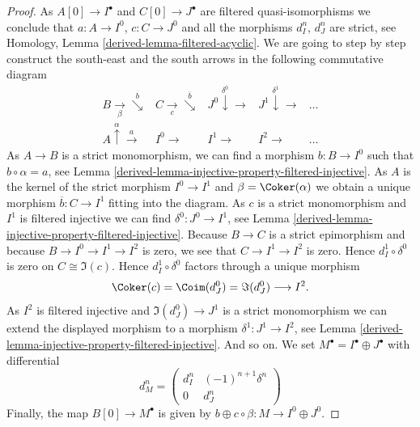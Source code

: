 \begin{proof}

As $A[0] \to I^\bullet$ and $C[0] \to J^\bullet$ are filtered
quasi-isomorphisms we conclude that $a : A \to I^0$, $c : C \to J^0$
and all the morphisms $d_I^n$, $d_J^n$ are strict, see
Homology, Lemma \ref{derived-lemma-filtered-acyclic}.
We are going to step by step construct the south-east and the south
arrows in the following commutative diagram
$$
\begin{array}{ccccc}B \underset{\beta}{\longrightarrow}\overset{b}{\searrow} & C \underset{c}{\longrightarrow}\overset{\overline{b}}{\searrow} & J^0 \overset{\delta^0}{\downarrow}\longrightarrow & J^1 \overset{\delta^1}{\downarrow}\longrightarrow & \ldots \\ A \overset{\alpha}{\uparrow}\overset{a}{\longrightarrow} & I^0 \longrightarrow & I^1 \longrightarrow & I^2 \longrightarrow & \ldots\end{array}
$$
As $A \to B$ is a strict monomorphism, we can find a morphism
$b : B \to I^0$ such that $b \circ \alpha = a$, see
Lemma \ref{derived-lemma-injective-property-filtered-injective}.
As $A$ is the kernel of the strict morphism $I^0 \to I^1$
and $\beta = \Coker(\alpha)$ we obtain a unique morphism
$\overline{b} : C \to I^1$ fitting into the diagram.
As $c$ is a strict monomorphism and $I^1$ is filtered injective
we can find $\delta^0 : J^0 \to I^1$, see
Lemma \ref{derived-lemma-injective-property-filtered-injective}.
Because $B \to C$ is a strict epimorphism and because
$B \to I^0 \to I^1 \to I^2$ is zero, we see that
$C \to I^1 \to I^2$ is zero. Hence $d_I^1 \circ \delta^0$
is zero on $C \cong \Im(c)$.
Hence $d_I^1 \circ \delta^0$ factors through a unique morphism
$$
\Coker(c) = \Coim(d_J^0) = \Im(d_J^0) \longrightarrow I^2.
$$
As $I^2$ is filtered injective and $\Im(d_J^0) \to J^1$ is a
strict monomorphism we can extend the displayed morphism to a morphism
$\delta^1 : J^1 \to I^2$, see
Lemma \ref{derived-lemma-injective-property-filtered-injective}.
And so on. We set $M^\bullet = I^\bullet \oplus J^\bullet$
with differential
$$
d_M^n =
\left(
\begin{matrix}
d_I^n & (-1)^{n + 1}\delta^n \\
0 & d_J^n
\end{matrix}
\right)
$$
Finally, the map $B[0] \to M^\bullet$ is given by
$b \oplus c \circ \beta : M \to I^0 \oplus J^0$.
\end{proof}

